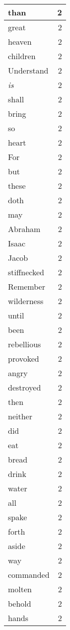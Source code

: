 \begin{center}
\begin{longtable}{l|r}
than & 2 \\ \hline
great & 2 \\ \hline
heaven & 2 \\ \hline
children & 2 \\ \hline
Understand & 2 \\ \hline
\emph{is} & 2 \\ \hline
shall & 2 \\ \hline
bring & 2 \\ \hline
so & 2 \\ \hline
heart & 2 \\ \hline
For & 2 \\ \hline
but & 2 \\ \hline
these & 2 \\ \hline
doth & 2 \\ \hline
may & 2 \\ \hline
Abraham & 2 \\ \hline
Isaac & 2 \\ \hline
Jacob & 2 \\ \hline
stiffnecked & 2 \\ \hline
Remember & 2 \\ \hline
wilderness & 2 \\ \hline
until & 2 \\ \hline
been & 2 \\ \hline
rebellious & 2 \\ \hline
provoked & 2 \\ \hline
angry & 2 \\ \hline
destroyed & 2 \\ \hline
then & 2 \\ \hline
neither & 2 \\ \hline
did & 2 \\ \hline
eat & 2 \\ \hline
bread & 2 \\ \hline
drink & 2 \\ \hline
water & 2 \\ \hline
all & 2 \\ \hline
spake & 2 \\ \hline
forth & 2 \\ \hline
aside & 2 \\ \hline
way & 2 \\ \hline
commanded & 2 \\ \hline
molten & 2 \\ \hline
behold & 2 \\ \hline
hands & 2 \\ \hline

\end{longtable}
\end{center}

